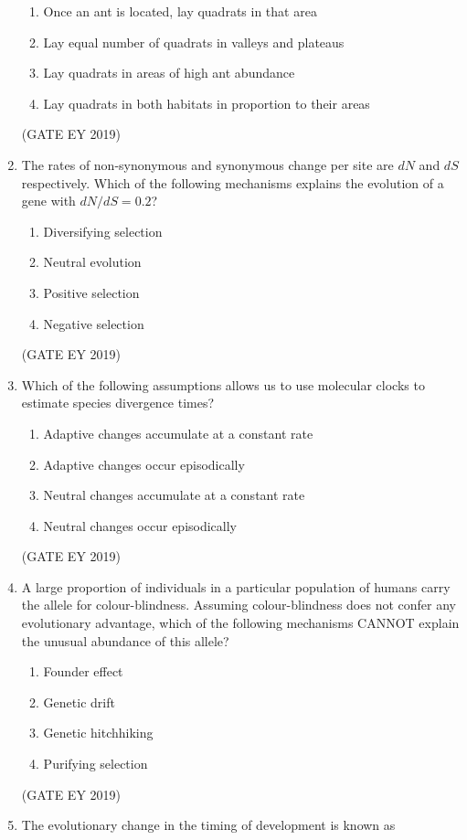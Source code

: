 \documentclass[journal,12pt,onecolumn]{IEEEtran}
\theoremstyle{remark}
\begin{document}
\begin{enumerate}[leftmargin=*]
\begin{enumerate}[nosep]
\item Once an ant is located, lay quadrats in that area
\item Lay equal number of quadrats in valleys and plateaus
\item Lay quadrats in areas of high ant abundance
\item Lay quadrats in both habitats in proportion to their areas
\end{enumerate}
\hfill{(GATE EY 2019)}
\item The rates of non-synonymous and synonymous change per site are $dN$ and $dS$ respectively. Which of the following mechanisms explains the evolution of a gene with $dN/dS = 0.2$?

\begin{multicols}{2}
\begin{enumerate}[nosep]
\item Diversifying selection
\item Neutral evolution
\item Positive selection
\item Negative selection
\end{enumerate}
\end{multicols}
\hfill{(GATE EY 2019)}

\item Which of the following assumptions allows us to use molecular clocks to estimate species divergence times?

\begin{multicols}{2}
\begin{enumerate}[nosep]
\item Adaptive changes accumulate at a constant rate
\item Adaptive changes occur episodically
\item Neutral changes accumulate at a constant rate
\item Neutral changes occur episodically
\end{enumerate}
\end{multicols}
\hfill{(GATE EY 2019)}
\item A large proportion of individuals in a particular population of humans carry the allele for colour-blindness. Assuming colour-blindness does not confer any evolutionary advantage, which of the following mechanisms CANNOT explain the unusual abundance of this allele?

\begin{multicols}{2}
\begin{enumerate}[nosep]
\item Founder effect
\item Genetic drift
\item Genetic hitchhiking
\item Purifying selection
\end{enumerate}
\end{multicols}
\hfill{(GATE EY 2019)}
\item The evolutionary change in the timing of development is known as


\end{enumerate}
\end{document}
